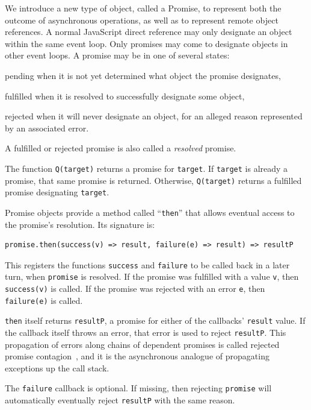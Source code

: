 \documentclass{llncs}
\begin{document}
We introduce a new type of object, called a Promise, to represent both the outcome of asynchronous operations, as well as to represent remote object references. A normal JavaScript direct reference may only designate an object within the same event loop. Only promises may come to designate objects in other event loops. A promise may be in one of several states:

\begin{description*}
  \item[pending] when it is not yet determined what object the promise designates,
  \item[fulfilled] when it is resolved to successfully designate some object,
  \item[rejected] when it will never designate an object, for an alleged reason represented by an associated error.
\end{description*}

A fulfilled or rejected promise is also called a \emph{resolved} promise.

The function {\tt Q(target)} returns a promise for {\tt target}. If {\tt target} is already a promise, that same promise is returned. Otherwise, {\tt Q(target)} returns a fulfilled promise designating {\tt target}.

Promise objects provide a method called ``{\tt then}'' that allows eventual access to the promise's resolution. Its signature is:

\begin{verbatim}
promise.then(success(v) => result, failure(e) => result) => resultP
\end{verbatim}

This registers the functions {\tt success} and {\tt failure} to be called back in a later turn, when {\tt promise} is resolved. If the promise was fulfilled with a value {\tt v}, then {\tt success(v)} is called. If the promise was rejected with an error {\tt e}, then {\tt failure(e)} is called.

{\tt then} itself returns {\tt resultP}, a promise for either of the callbacks' {\tt result} value. If the callback itself throws an error, that error is used to reject {\tt resultP}. This propagation of errors along chains of dependent promises is called rejected promise contagion~\cite{miller:strangers}, and it is the asynchronous analogue of propagating exceptions up the call stack.

The {\tt failure} callback is optional. If missing, then rejecting {\tt promise} will automatically eventually reject {\tt resultP} with the same reason.
\end{document}
